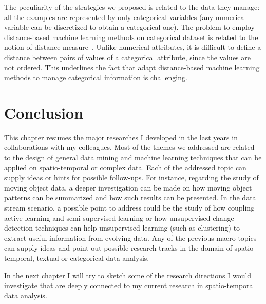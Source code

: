 The peculiarity of the strategies we proposed is related to the data they manage: all the examples are represented by only categorical variables (any numerical variable can be discretized to obtain a categorical one). The problem to employ distance-based machine learning methods on categorical dataset is related to the notion of distance measure~\cite{ChandolaBK09}. Unlike numerical attributes, it is difficult to define a distance between pairs of values of a categorical attribute, since the values are not ordered. This underlines the fact that adapt distance-based machine learning methods to manage categorical information is challenging.

\section{Conclusion}
This chapter resumes the major researches I developed in the last years in collaborations with my colleagues. 
Most of the themes we addressed are related to the design of general data mining and machine learning techniques that can be applied on spatio-temporal or complex data. Each of the addressed topic can supply ideas or hints for possible follow-ups. For instance, regarding the study of moving object data, a  deeper investigation can be made on how moving object patterns can be summarized and how such results can be presented. 
In the data stream scenario, a possible point to address could be the study of how coupling active learning and semi-supervised learning or how unsupervised change detection techniques can help unsupervised learning (such as clustering) to extract useful information from evolving data.
Any of the previous macro topics can supply ideas and point out possible research tracks in the domain of spatio-temporal, textual or categorical data analysis. 

In the next chapter I will try to sketch some of the research directions I would investigate that are deeply connected to my current research in spatio-temporal data analysis.








